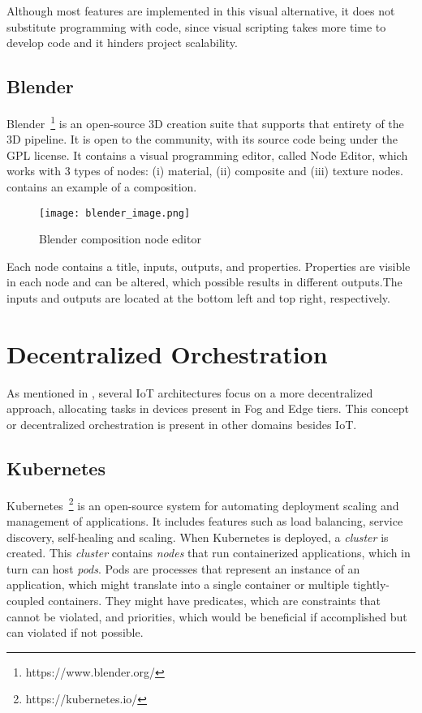 Although most features are implemented in this visual alternative, it does not substitute programming with code, since visual scripting takes more time to develop code and it hinders project scalability.

\subsection{Blender}\label{sec:blender}

Blender~\footnote{https://www.blender.org/} is an open-source 3D creation suite that supports that entirety of the 3D pipeline. It is open to the community, with its source code being under the GPL license. It contains a visual programming editor, called Node Editor, which works with 3 types of nodes: (i) material, (ii) composite and (iii) texture nodes.  contains an example of a composition.

\begin{figure}[!ht]
\centering
\texttt{[image: blender\_image.png]}
\caption[Blender composition node editor]{Blender composition node editor~\cite{blender_image}}
\label{fig:blender}
\end{figure}

Each node contains a title, inputs, outputs, and properties. Properties are visible in each node and can be altered, which possible results in different outputs.The inputs and outputs are located at the bottom left and top right, respectively. 

\section{Decentralized Orchestration}\label{sec:background_decentralized_orchestration}

As mentioned in , several IoT architectures focus on a more decentralized approach, allocating tasks in devices present in Fog and Edge tiers. This concept or decentralized orchestration is present in other domains besides IoT.

\subsection{Kubernetes}\label{sec:kubernetes}

Kubernetes~\footnote{https://kubernetes.io/} is an open-source system for automating deployment scaling and management of applications. It includes features such as load balancing, service discovery, self-healing and scaling. When Kubernetes is deployed, a \textit{cluster} is created. This \textit{cluster} contains \textit{nodes} that run containerized applications, which in turn can host \textit{pods}. Pods are processes that represent an instance of an application, which might translate into a single container or multiple tightly-coupled containers. They might have predicates, which are constraints that cannot be violated, and priorities, which would be beneficial if accomplished but can violated if not possible.

